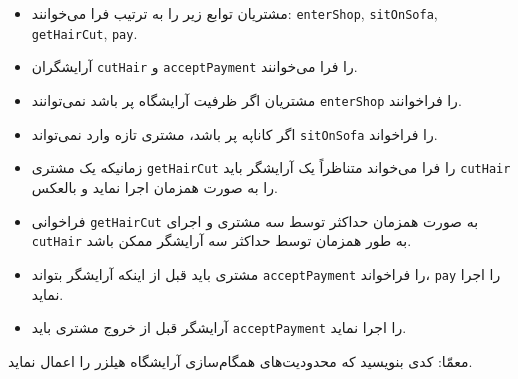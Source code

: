 \documentclass{book}
\begin{document}
\begin{itemize}

\item 
    مشتریان توابع زیر را به ترتیب فرا می‌خوانند:
{\tt enterShop}, {\tt sitOnSofa},
{\tt getHairCut}, {\tt pay}.   

\item 
    آرایشگران  {\tt cutHair} و {\tt acceptPayment} را فرا می‌خوانند. 

\item 
    مشتریان اگر ظرفیت آرایشگاه پر باشد نمی‌توانند {\tt enterShop}  را فراخوانند. 

\item 
    اگر کاناپه پر باشد، مشتری‌ تازه وارد نمی‌تواند {\tt sitOnSofa} را فراخواند. 

\item 
    زمانیکه یک مشتری {\tt getHairCut} را فرا می‌خواند متناظراً  یک آرایشگر باید {\tt cutHair} را به صورت همزمان اجرا نماید و بالعکس. 

\item 
    فراخوانی {\tt getHairCut} به صورت همزمان حداکثر توسط سه مشتری  و اجرای {\tt cutHair} به طور همزمان توسط حداکثر 
    سه آرایشگر  ممکن باشد.

\item 
    مشتری باید قبل از اینکه آرایشگر بتواند {\tt acceptPayment} را فراخواند،  {\tt pay}  را اجرا نماید. 

\item 
    آرایشگر قبل از خروج مشتری باید  {\tt acceptPayment} را اجرا نماید. 

\end{itemize}

    معمّا: کدی بنویسید که محدودیت‌های همگام‌سازی آرایشگاه هیلزر را اعمال نماید. 
\end{document}

